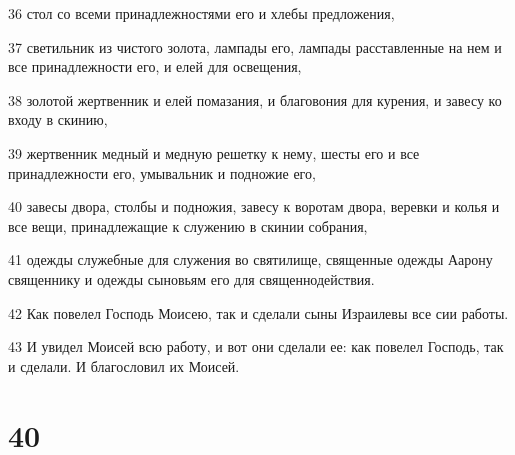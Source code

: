 \par 36 стол со всеми принадлежностями его и хлебы предложения,
\par 37 светильник из чистого золота, лампады его, лампады расставленные на нем и все принадлежности его, и елей для освещения,
\par 38 золотой жертвенник и елей помазания, и благовония для курения, и завесу ко входу в скинию,
\par 39 жертвенник медный и медную решетку к нему, шесты его и все принадлежности его, умывальник и подножие его,
\par 40 завесы двора, столбы и подножия, завесу к воротам двора, веревки и колья и все вещи, принадлежащие к служению в скинии собрания,
\par 41 одежды служебные для служения во святилище, священные одежды Аарону священнику и одежды сыновьям его для священнодействия.
\par 42 Как повелел Господь Моисею, так и сделали сыны Израилевы все сии работы.
\par 43 И увидел Моисей всю работу, и вот они сделали ее: как повелел Господь, так и сделали. И благословил их Моисей.

\chapter{40}

